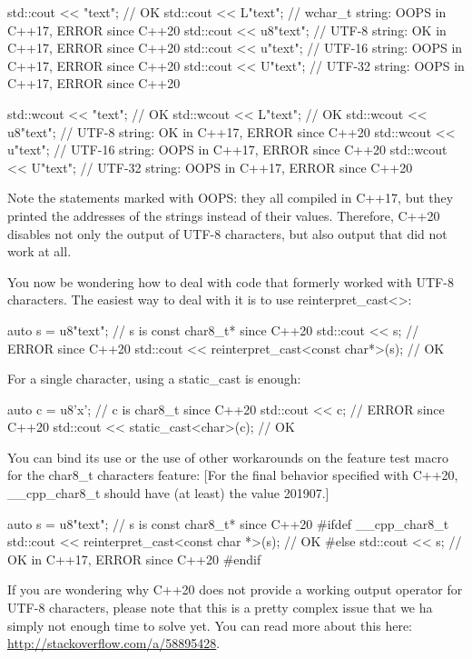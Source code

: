\begin{cpp}
std::cout << "text"; // OK
std::cout << L"text"; // wchar_t string: OOPS in C++17, ERROR since C++20
std::cout << u8"text"; // UTF-8 string: OK in C++17, ERROR since C++20
std::cout << u"text"; // UTF-16 string: OOPS in C++17, ERROR since C++20
std::cout << U"text"; // UTF-32 string: OOPS in C++17, ERROR since C++20

std::wcout << "text"; // OK
std::wcout << L"text"; // OK
std::wcout << u8"text"; // UTF-8 string: OK in C++17, ERROR since C++20
std::wcout << u"text"; // UTF-16 string: OOPS in C++17, ERROR since C++20
std::wcout << U"text"; // UTF-32 string: OOPS in C++17, ERROR since C++20
\end{cpp}

Note the statements marked with OOPS: they all compiled in C++17, but they printed the addresses of the strings instead of their values. Therefore, C++20 disables not only the output of UTF-8 characters, but also output that did not work at all.


You now be wondering how to deal with code that formerly worked with UTF-8 characters. The easiest way to deal with it is to use reinterpret\_cast<>:

\begin{cpp}
auto s = u8"text"; // s is const char8_t* since C++20
std::cout << s; // ERROR since C++20
std::cout << reinterpret_cast<const char*>(s); // OK
\end{cpp}

For a single character, using a static\_cast is enough:

\begin{cpp}
auto c = u8'x'; // c is char8_t since C++20
std::cout << c; // ERROR since C++20
std::cout << static_cast<char>(c); // OK
\end{cpp}

You can bind its use or the use of other workarounds on the feature test macro for the char8\_t characters feature: [For the final behavior specified with C++20, \_\_cpp\_char8\_t should have (at least) the value 201907.]

\begin{cpp}
auto s = u8"text"; // s is const char8_t* since C++20
#ifdef __cpp_char8_t
std::cout << reinterpret_cast<const char *>(s); // OK
#else
std::cout << s; // OK in C++17, ERROR since C++20
#endif
\end{cpp}

If you are wondering why C++20 does not provide a working output operator for UTF-8 characters, please note that this is a pretty complex issue that we ha simply not enough time to solve yet. You can read more about this here: \url{http://stackoverflow.com/a/58895428}.

